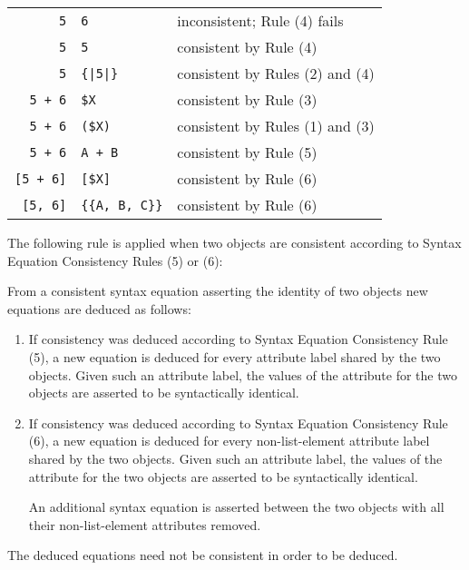 \documentclass[12pt]{article}
\newcommand{\TT}[1]{{\tt \bfseries #1}}
\newcommand{\ikey}[2]{{\bf \em #1}\index{#2}}
\newenvironment{indpar}[1][0.3in]%
	{\begin{list}{}%
		     {\setlength{\itemsep}{0in}%
		      \setlength{\topsep}{0in}%
		      \setlength{\parsep}{1ex}%
		      \setlength{\labelwidth}{#1}%
		      \setlength{\leftmargin}{#1}%
		      \addtolength{\leftmargin}{\labelsep}}%
	 \item}%
	{\end{list}}
\begin{document}
\begin{center}
\begin{tabular}{r@\TT{~:=:~}ll}
\verb/5/ & \verb/6/      & inconsistent; Rule (4) fails \\
\verb/5/ & \verb/5/      & consistent by Rule (4) \\
\verb/5/ & \verb/{|5|}/  & consistent by Rules (2) and (4) \\
\verb/5 + 6/ & \verb/$X/ & consistent by Rule (3) \\
\verb/5 + 6/ & \verb/($X)/ & consistent by Rules (1) and (3) \\
\verb/5 + 6/ & \verb/A + B/ & consistent by Rule (5) \\
\verb/[5 + 6]/ & \verb/[$X]/ & consistent by Rule (6) \\
\verb/[5, 6]/ & \verb/{{A, B, C}}/ & consistent by Rule (6) \\
\end{tabular}
\end{center}

The following rule is applied when two objects are consistent according
to Syntax Equation Consistency Rules (5) or (6):

\begin{indpar}
\begin{list}{}{}
\item[\ikey{Syntax Equation Propagation Rules}%
           {propagation rule!syntax equation}:]%
	   \label{SYNTAX-EQUATION-PROPAGATION-RULE}
From a consistent syntax equation asserting the identity
of two objects new equations are deduced as follows:
\begin{enumerate}
\item
If consistency was deduced according to Syntax Equation Consistency Rule (5),
a new equation is deduced for every attribute label shared by the two objects.
Given such an attribute label, the values
of the attribute for the two objects are asserted to be syntactically
identical.
\item
If consistency was deduced according to Syntax Equation Consistency Rule (6),
a new equation is deduced for every non-list-element
attribute label shared by the two objects.
Given such an attribute label, the values
of the attribute for the two objects are asserted to be syntactically
identical.

\medskip

An additional syntax equation is asserted between the two objects
with all their non-list-element attributes removed.
\end{enumerate}

The deduced equations need not be consistent in order to be deduced.
\end{list}
\end{indpar}
\end{document}
